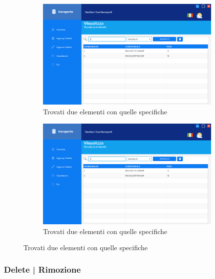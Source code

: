 \begin{figure}[H]
	\begin{subfigure}{.6\textwidth}
		\centering
		\includegraphics[width=1\linewidth]{./img/Applicativo/search_bar7.png}
		\caption{Trovati due elementi con quelle specifiche}
		\label{fig:search_bar7}
	\end{subfigure}%
	\begin{subfigure}{.6\textwidth}
		\centering
		\includegraphics[width=1\linewidth]{./img/Applicativo/search_bar8.png}
		\caption{Trovati due elementi con quelle specifiche}
		\label{fig:search_bar8}
	\end{subfigure}
	\label{fig:search_bars2}
\end{figure}



\enlargethispage{1\linewidth}

\subsubsection{Delete | Rimozione}

